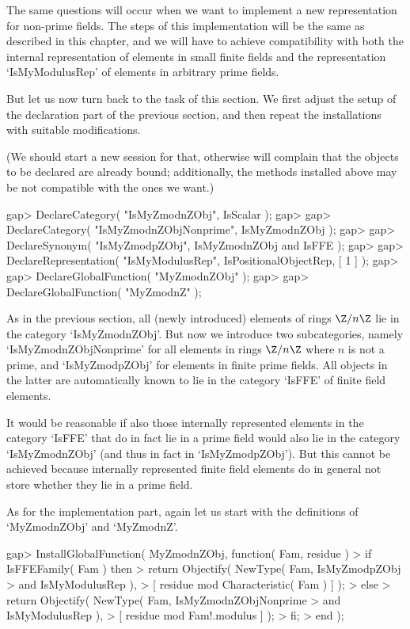 The same questions will occur when we want to implement a new
representation for non-prime fields.
The steps of this implementation will be the same as described in this
chapter,
and we will have to achieve compatibility with both the internal
representation of elements in small finite fields and the representation
`IsMyModulusRep' of elements in arbitrary prime fields.

But let us now turn back to the task of this section.
We first adjust the setup of the declaration part of the previous section,
and then repeat the installations with suitable modifications.

(We should start a new {\GAP} session for that, otherwise {\GAP} will
complain that the objects to be declared are already bound;
additionally, the methods installed above may be not compatible with
the ones we want.)

\beginexample
gap> DeclareCategory( "IsMyZmodnZObj", IsScalar );
gap> 
gap> DeclareCategory( "IsMyZmodnZObjNonprime", IsMyZmodnZObj );
gap> 
gap> DeclareSynonym( "IsMyZmodpZObj", IsMyZmodnZObj and IsFFE );
gap> 
gap> DeclareRepresentation( "IsMyModulusRep", IsPositionalObjectRep, [ 1 ] );
gap> 
gap> DeclareGlobalFunction( "MyZmodnZObj" );
gap> 
gap> DeclareGlobalFunction( "MyZmodnZ" );
\endexample

As in the previous section,
all (newly introduced) elements of rings $\Z/n\Z$ lie in the category
`IsMyZmodnZObj'.
But now we introduce two subcategories, namely `IsMyZmodnZObjNonprime'
for all elements in rings $\Z/n\Z$ where $n$ is not a prime,
and `IsMyZmodpZObj' for elements in finite prime fields.
All objects in the latter are automatically known to lie in the
category `IsFFE' of finite field elements.

It would be reasonable if also those internally represented elements
in the category `IsFFE' that do in fact lie in a prime field
would also  lie in the category `IsMyZmodnZObj' (and thus in fact in
`IsMyZmodpZObj').
But this cannot be achieved because internally represented finite field
elements do in general not store whether they lie in a prime field.

As for the implementation part,
again let us start with the definitions of `MyZmodnZObj' and `MyZmodnZ'.

\beginexample
gap> InstallGlobalFunction( MyZmodnZObj, function( Fam, residue )
>    if IsFFEFamily( Fam ) then
>      return Objectify( NewType( Fam, IsMyZmodpZObj
>                                  and IsMyModulusRep ),
>                    [ residue mod Characteristic( Fam ) ] );
>    else
>      return Objectify( NewType( Fam, IsMyZmodnZObjNonprime
>                                  and IsMyModulusRep ),
>                    [ residue mod Fam!.modulus ] );
>    fi;
> end );
\endexample

